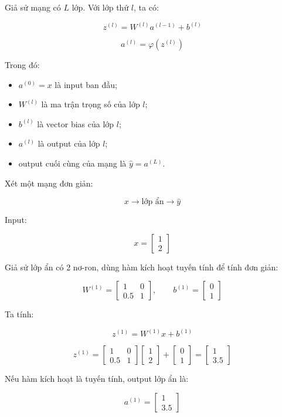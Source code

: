 \documentclass[12pt,a4paper]{report}
\begin{document}
Giả sử mạng có $L$ lớp. Với lớp thứ $l$, ta có:

\[
    z^{(l)} = W^{(l)}a^{(l-1)} + b^{(l)}
\]

\[
    a^{(l)} = \varphi \left(z^{(l)}\right)
\]

Trong đó:

\begin{itemize}
    \item $a^{(0)} = x$ là input ban đầu;
    \item $W^{(l)}$ là ma trận trọng số của lớp $l$;
    \item $b^{(l)}$ là vector bias của lớp $l$;
    \item $a^{(l)}$ là output của lớp $l$;
    \item output cuối cùng của mạng là $\hat{y}=a^{(L)}$.
\end{itemize}

\begin{vidu}
Xét một mạng đơn giản:

\[
    x \rightarrow \text{lớp ẩn} \rightarrow \hat{y}
\]

Input:

\[
    x = 
    \begin{bmatrix}
    1\\
    2
    \end{bmatrix}
\]

Giả sử lớp ẩn có 2 nơ-ron, dùng hàm kích hoạt tuyến tính để tính đơn giản:

\[
    W^{(1)}=
    \begin{bmatrix}
    1 & 0\\
    0.5 & 1
    \end{bmatrix},
    \qquad
    b^{(1)}=
    \begin{bmatrix}
    0\\
    1
    \end{bmatrix}
\]

Ta tính:

\[
    z^{(1)} = W^{(1)}x+b^{(1)}
\]

\[
    z^{(1)}
    =
    \begin{bmatrix}
    1 & 0\\
    0.5 & 1
    \end{bmatrix}
    \begin{bmatrix}
    1\\
    2
    \end{bmatrix}
    +
    \begin{bmatrix}
    0\\
    1
    \end{bmatrix}
    =
    \begin{bmatrix}
    1\\
    3.5
    \end{bmatrix}
\]

Nếu hàm kích hoạt là tuyến tính, output lớp ẩn là:

\[
    a^{(1)}=
    \begin{bmatrix}
    1\\
    3.5
    \end{bmatrix}
\]
\end{vidu}
\end{document}
